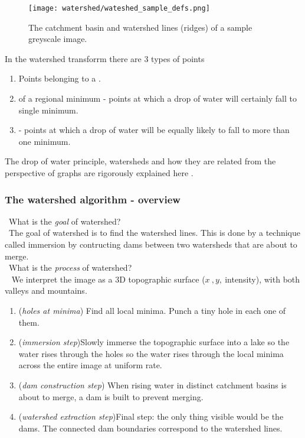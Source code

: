 \documentclass[a4paper]{article}
\begin{document}
\begin{figure}[H]
	\centering %
    	\texttt{[image: watershed/wateshed\_sample\_defs.png]}
    \caption{The catchment basin and watershed lines (ridges) of a sample greyscale image.}
\end{figure}
In the watershed transforrm there are 3 types of points
\begin{enumerate}
    \item Points belonging to a .
    \item {} of a regional minimum - points at which a drop of water will certainly fall to single minimum.
    \item {} - points at which a drop of water will be equally likely to fall to more than one minimum.
\end{enumerate}
The drop of water principle, watersheds and how they are related from the perspective of graphs are rigorously explained here \TODO[ref]. 




\subsubsection{The watershed algorithm - overview}

\faQuestionCircle \ What is the \textit{goal} of watershed?\\
\faCheckCircle \ The goal of watershed is to find the watershed lines. This is done by a technique called immersion by contructing dams between two watersheds that are about to merge. \\
\faQuestionCircle \ What is the \textit{process} of watershed?\\
\faCheckCircle \ 
    We interpret the image as a 3D topographic surface ($x\ ,y,\ $intensity), with both valleys and mountains.
\begin{enumerate}
    \item (\textit{holes at minima}) Find all local minima. Punch a tiny hole in each one of them.
    \item (\textit{immersion step})Slowly immerse the topographic surface into a lake so the water rises through the holes so the water rises through the local minima across the entire image at uniform rate.
    \item (\textit{dam construction step}) When rising water in distinct catchment basins is about to merge, a dam is built to prevent merging.
    \item (\textit{watershed extraction step})Final step: the only thing visible would be the dams. The connected dam boundaries correspond to the watershed lines.
\end{enumerate}
\end{document}
